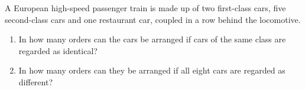 A European high-speed passenger train is made up of two first-class cars, five second-class cars and one restaurant car, coupled in a row behind the locomotive.
\begin{enumerate}
\item[(a)] In how many orders can the cars be arranged if cars of the same class are regarded as identical?
\item[(b)] In how many orders can they be arranged if all eight cars are regarded as different?
\end{enumerate}

